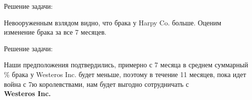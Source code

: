 \documentclass{beamer}
\begin{document}
\begin{frame}{Решение задачи:}

\begin{figure}[htb]
\end{figure}
Невооруженным взлядом видно, что брака у Harpy Co. больше.
Оценим изменение брака за все 7 месяцев.
\end{frame}

\begin{frame}{Решение задачи:}

\begin{figure}[htb]
\end{figure}
Наши предположения подтвердились, примерно с 7 месяца в среднем суммарный \% брака у Westeros Inc. будет меньше,
поэтому в течение 11 месяцев, пока идет война с 7ю королевствами, нам будет выгодно сотрудничать с \\
\textbf{Westeros Inc.} 

\end{frame}
\end{document}
